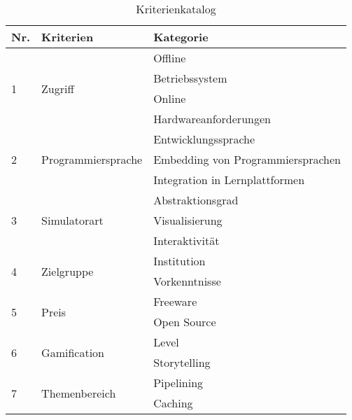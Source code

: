 \begin{table}

\centering
\caption{Kriterienkatalog}
\label{tab:kriterien}
\small

\begin{tabular}{|l|l|l|}
\hline

\textbf{Nr.} & \textbf{Kriterien} & \textbf{Kategorie} \\
\hline

\multirow{4}{*}{1} & \multirow{4}{*}{Zugriff} & Offline \\
                   &                          & Betriebssystem \\
                   &                          & Online \\
                   &                          & Hardwareanforderungen \\
\hline

\multirow{3}{*}{2} & \multirow{3}{*}{Programmiersprache} & Entwicklungssprache \\
                   &                                     & Embedding von Programmiersprachen \\
                   &                                     & Integration in Lernplattformen \\
\hline

\multirow{3}{*}{3} & \multirow{3}{*}{Simulatorart} & Abstraktionsgrad \\
                   &                               & Visualisierung \\
                   &                               & Interaktivität \\
\hline

\multirow{2}{*}{4} & \multirow{2}{*}{Zielgruppe} & Institution \\
                   &                             & Vorkenntnisse \\
\hline

\multirow{2}{*}{5} & \multirow{2}{*}{Preis} & Freeware \\
                   &                        & Open Source \\
\hline

\multirow{2}{*}{6} & \multirow{2}{*}{Gamification} & Level \\
                   &                               & Storytelling \\
\hline

\multirow{2}{*}{7} & \multirow{2}{*}{Themenbereich} & Pipelining \\ 
                   &                                & Caching \\
\hline


\end{tabular}
\end{table}
